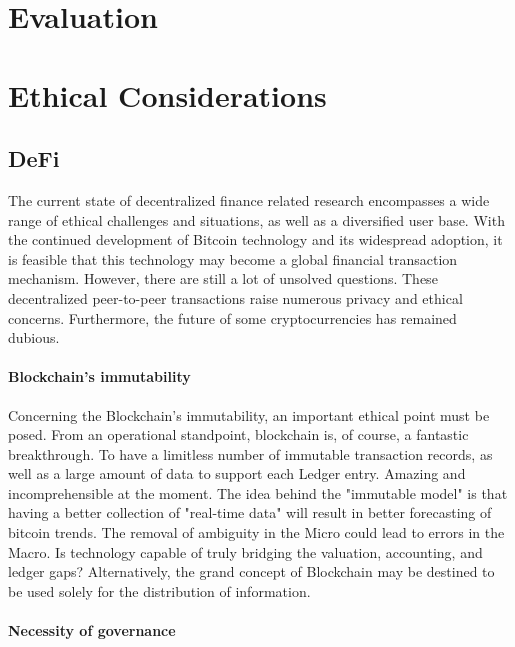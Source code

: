 \documentclass[10pt,twocolumn]{article}
\begin{document}
\section{Evaluation}



\section{Ethical Considerations}

\subsection{DeFi}
The current state of decentralized finance related research encompasses a wide range of ethical challenges and situations, as well as a diversified user base. With the continued development of Bitcoin technology and its widespread adoption, it is feasible that this technology may become a global financial transaction mechanism. However, there are still a lot of unsolved questions. These decentralized peer-to-peer transactions raise numerous privacy and ethical concerns. Furthermore, the future of some cryptocurrencies has remained dubious.
\paragraph{Blockchain's immutability}
Concerning the Blockchain's immutability, an important ethical point must be posed. From an operational standpoint, blockchain is, of course, a fantastic breakthrough. To have a limitless number of immutable transaction records, as well as a large amount of data to support each Ledger entry. Amazing and incomprehensible at the moment. The idea behind the "immutable model" is that having a better collection of "real-time data" will result in better forecasting of bitcoin trends. The removal of ambiguity in the Micro could lead to errors in the Macro. Is technology capable of truly bridging the valuation, accounting, and ledger gaps? Alternatively, the grand concept of Blockchain may be destined to be used solely for the distribution of information.
\paragraph{Necessity of governance}
\end{document}
